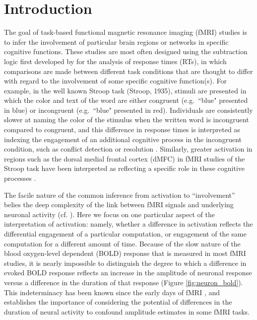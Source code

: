 \documentclass[titlepage,12pt] {article}
\begin{document}
\section*{Introduction}

The goal of task-based functional magnetic resonance imaging (fMRI) studies is to infer the involvement of particular brain regions or networks in specific cognitive functions.  These studies are most often designed using the subtraction logic first developed by \citet{donders1969} for the analysis of response times (RTs), in which comparisons are made between different task conditions that are thought to differ with regard to the involvement of some specific cognitive function(s).  For example, in the well known Stroop task (Stroop, 1935), stimuli are presented in which the color and text of the word are either congruent (e.g.\ ``blue" presented in blue) or incongruent (e.g.\ ``blue" presented in red).  Individuals are consistently slower at naming the color of the stimulus when the written word is incongruent compared to congruent, and this difference in response times is interpreted as indexing the engagement of an additional cognitive process in the incongruent condition, such as conflict detection or resolution \citep{botvinick2001}. Similarly, greater activation in regions such as the dorsal medial frontal cortex (dMFC) in fMRI studies of the Stroop task have been interpreted as reflecting a specific role in these cognitive processes \citep{botvinick1999, macdonald2000, kernsAnteriorCingulateConflict2004}.  

The facile nature of the common inference from activation to ``involvement'' belies the deep complexity of the link between fMRI signals and underlying neuronal activity (cf. \citet{logothetisWhatWeCan2008}).  Here we focus on one particular aspect of the interpretation of activation: namely, whether a difference in activation reflects the differential engagement of a particular computation, or engagement of the same computation for a different amount of time.  Because of the slow nature of the blood oxygen-level dependent (BOLD) response that is measured in most fMRI studies, it is nearly impossible to distinguish the degree to which a difference in evoked BOLD response reflects an increase in the amplitude of neuronal response versus a difference in the duration of that response (Figure \ref{fig:neuron_bold}).  This indeterminacy has been known since the early days of fMRI \citep{savoy1995, fslbook2001}, and establishes the importance of considering the potential of differences in the duration of neural activity to confound amplitude estimates in some fMRI tasks.  
\end{document}
